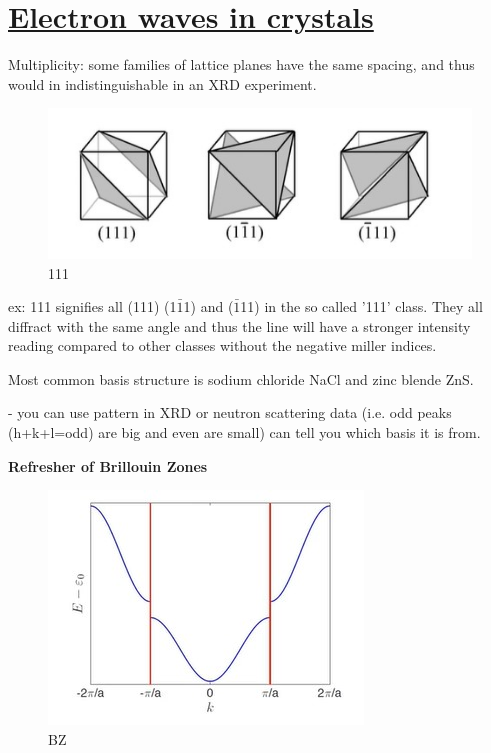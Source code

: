 \section[Electron waves in crystals]{\hyperlink{toc}{Electron waves in crystals}}

Multiplicity: some families of lattice planes have the same spacing, and thus would in indistinguishable in an XRD experiment.

\begin{figure}
  \includegraphics[width=0.75\linewidth]{Images/111 class.jpg}
  \caption{111}
  \label{fig:111}
\end{figure}

ex: {111} signifies all (111) (1$\bar{1}$1) and ($\bar{1}$11) in the so called '111' class. They all diffract with the same angle and thus the line will have a stronger intensity reading compared to other classes without the negative miller indices.

Most common basis structure is sodium chloride NaCl and zinc blende ZnS.

- you can use pattern in XRD or neutron scattering data (i.e. odd peaks (h+k+l=odd) are big and even are small) can tell you which basis it is from.

\textbf{Refresher of Brillouin Zones}

\begin{figure}
  \includegraphics[width=0.75\linewidth]{Images/BrillouinZone.jpg}
  \caption{BZ}
  \label{fig:BZ}
\end{figure}

